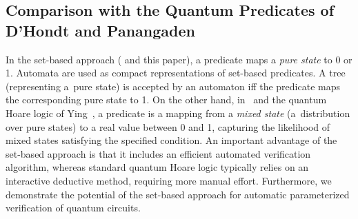 

\subsection{Comparison with the Quantum Predicates of D'Hondt and Panangaden~\cite{d2006quantum}}\label{subsec:comparelstawithta}

In the set-based approach (\cite{ChenCLLT23,ChenCLLTY23} and this paper), a
predicate maps a \emph{pure state} to 0 or 1. Automata are used as compact
representations of set-based predicates.
A tree (representing a~pure state) is accepted by an automaton iff the predicate maps the
corresponding pure state to 1.
On the other hand, in~\cite{d2006quantum} and the quantum Hoare logic of
Ying~\cite{ying2012floyd}, a predicate is a mapping from a \emph{mixed state}
(a~distribution over pure states) to a real value between 0 and 1, capturing the
likelihood of mixed states satisfying the specified condition.
An important advantage of the set-based approach is that it includes an efficient automated verification algorithm, whereas standard quantum Hoare logic typically relies on an interactive deductive method, requiring more manual effort. Furthermore, we demonstrate the potential of the set-based approach for automatic parameterized verification of quantum circuits.


